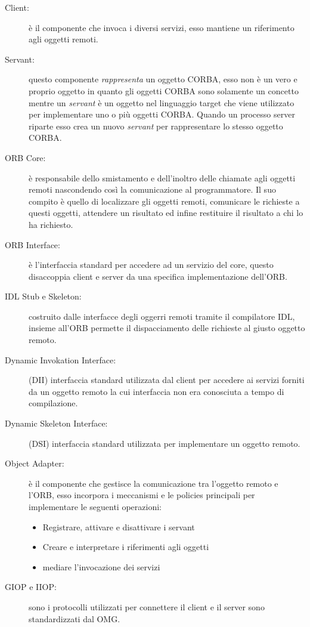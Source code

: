 \begin{description}
	\item[Client:] è il componente che invoca i diversi servizi, esso mantiene un riferimento agli oggetti remoti.
	\item[Servant:] questo componente \emph{rappresenta} un oggetto CORBA, esso non è un vero e proprio oggetto in quanto gli oggetti CORBA sono solamente un concetto mentre un \emph{servant} è un oggetto nel linguaggio target che viene utilizzato per implementare uno o più oggetti CORBA. Quando un processo server riparte esso crea un nuovo \emph{servant} per rappresentare lo stesso oggetto CORBA.
	\item[ORB Core:] è responsabile dello smistamento e dell'inoltro delle chiamate agli oggetti remoti nascondendo così la comunicazione al programmatore. Il suo compito è quello di localizzare gli oggetti remoti, comunicare le richieste a questi oggetti, attendere un risultato ed infine restituire il risultato a chi lo ha richiesto.
	\item[ORB Interface:] è l'interfaccia standard per accedere ad un servizio del core, questo disaccoppia client e server da una specifica implementazione dell'ORB.
	\item[IDL Stub e Skeleton:] costruito dalle interfacce degli oggerri remoti tramite il compilatore IDL, insieme all'ORB permette il dispacciamento delle richieste al giusto oggetto remoto.
	\item[Dynamic Invokation Interface:] (DII) interfaccia standard utilizzata dal client per accedere ai servizi forniti da un oggetto remoto la cui interfaccia non era conosciuta a tempo di compilazione.
	\item[Dynamic Skeleton Interface:] (DSI) interfaccia standard utilizzata per implementare un oggetto remoto.
	\item[Object Adapter:] è il componente che gestisce la comunicazione tra l'oggetto remoto e l'ORB, esso incorpora i meccanismi e le policies principali per implementare le seguenti operazioni:
	\begin{itemize}
		\item Registrare, attivare e disattivare i servant
		\item Creare e interpretare i riferimenti agli oggetti
		\item mediare l'invocazione dei servizi
	\end{itemize}
	\item[GIOP e IIOP:] sono i protocolli utilizzati per connettere il client e il server sono standardizzati dal OMG.
\end{description}
